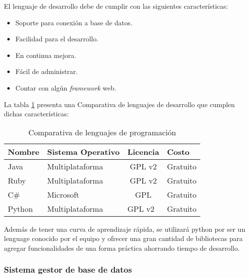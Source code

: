 El lenguaje de desarrollo debe de cumplir con las siguientes características:

\begin{itemize}
    \item Soporte para conexión a base de datos.
    \item Facilidad para el desarrollo.
    \item En continua mejora.
    \item Fácil de administrar.
    \item Contar con algún \textit{framework} web.
\end{itemize}

La tabla \ref{tab:options_lenguage} presenta una Comparativa de lenguajes de desarrollo que cumplen dichas características:

\begin{table}[h!]
    \centering
    \begin{tabular}{|l|l|c|c|}
    \hline
    Nombre & Sistema Operativo & \multicolumn{1}{l|}{Licencia}                       & \multicolumn{1}{l|}{Costo}                            \\ \hline
    Java   & Multiplataforma   & GPL v2                                              & Gratuito                                              \\ \hline
    Ruby   & Multiplataforma   & GPL v2                                              & Gratuito                                              \\ \hline
    C\#    & Microsoft         & GPL                                                 & Gratuito                                              \\ \hline
    \rowcolor[HTML]{66BB6A}
    Python & Multiplataforma   & \multicolumn{1}{l|}{\cellcolor[HTML]{66BB6A}GPL v2} & \multicolumn{1}{l|}{\cellcolor[HTML]{66BB6A}Gratuito} \\ \hline
    \end{tabular}
    \caption{Comparativa de lenguajes de programación}
    \label{tab:options_lenguage}
    \end{table}


Además de tener una curva de aprendizaje rápida, se utilizará python por ser un lenguage conocido por el equipo y ofrecer una gran cantidad de bibliotecas para agregar funcionalidades de una forma práctica ahorrando tiempo de desarrollo.

\subsubsection{Sistema gestor de base de datos}

